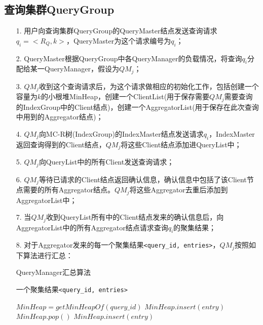 \documentclass{elegantpaper}
\begin{document}
\subsection{查询集群QueryGroup}
\begin{itemize}
    \item[1.] 用户向查询集群QueryGroup的QueryMaster结点发送查询请求$q_i=<R_Q,k>$，QueryMaster为这个请求编号为$q_i$；
    \item[2.] QueryMaster根据QueryGroup中各QueryManager的负载情况，将查询$q_i$分配给某一QueryManager，假设为$QM_j$；
    \item[3.] $QM_j$收到这个查询请求后，为这个请求做相应的初始化工作，包括创建一个容量为$k$的小根堆MinHeap，创建一个ClientList(用于保存需要$QM_j$需要查询的IndexGroup中的Client结点)，创建一个AggregatorList(用于保存在此次查询中用到的Aggregator结点)；
    \item[4.] $QM_j$向MC-R树(IndexGroup)的IndexMaster结点发送请求$q_i$，IndexMaster返回查询得到的Client结点，$QM_j$将这些Client结点添加进QueryList中；
    \item[5.] $QM_j$向QueryList中的所有Client发送查询请求；
    \item[6.] $QM_j$等待已请求的Client结点返回确认信息，确认信息中包括了该Client节点需要的所有Aggregator结点。$QM_j$将这些Aggregator去重后添加到AggregatorList中；
    \item[7.] 当$QM_j$收到QueryList所有中的Client结点发来的确认信息后，向AggregatorList中的所有Aggregator结点请求查询$q_i$的聚集结果；
    \item[8.] 对于Aggregator发来的每一个聚集结果\verb|<query_id, entries>|，$QM_j$按照如下算法进行汇总：
              \begin{algorithm}

                \begin{algorithmic}[1]
                    \caption{QueryManager汇总算法}
                    \Require 一个聚集结果\verb|<query_id, entries>|

                        \State $MinHeap = getMinHeapOf(query\_id)$
                                \State $MinHeap.insert(entry)$
                            \Else
                                    \State $MinHeap.pop()$
                                    \State $MinHeap.insert(entry)$
                                \EndIf
                            \EndIf
                        \EndFor
                    \EndFunction
                    

\end{algorithmic}
\end{algorithm}
\end{itemize}
\end{document}
